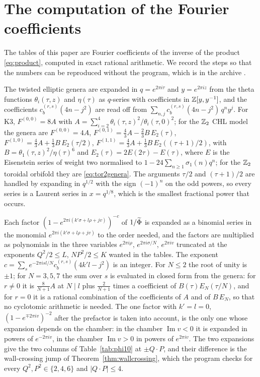 \section{The computation of the Fourier coefficients}\label{app:computation}

The tables of this paper are Fourier coefficients of the inverse of the product \eqref{eq:product}, computed in exact rational arithmetic. We record the steps so that the numbers can be reproduced without the program, which is in the archive \cite{Bha26}.

 The twisted elliptic genera are expanded in $q = e^{2\pi i\tau}$ and $y = e^{2\pi i z}$ from the theta functions $\theta_i(\tau,z)$ and $\eta(\tau)$ as $q$-series with coefficients in $\mathbb{Z}[y,y^{-1}]$, and the coefficients $c^{(r,s)}_b(4n-j^2)$ are read off from $\sum_{n,j} c^{(r,s)}_b(4n-j^2)\,q^n y^j$. For K3, $F^{(0,0)} = 8A$ with $A = \sum_{i=2}^4\theta_i(\tau,z)^2/\theta_i(\tau,0)^2$; for the $\mathbb{Z}_2$ CHL model the genera are $F^{(0,0)} = 4A$, $F^{(0,1)} = \tfrac43 A - \tfrac23 B\,E_2(\tau)$, $F^{(1,0)} = \tfrac43 A + \tfrac13 B\,E_2(\tau/2)$, $F^{(1,1)} = \tfrac43 A + \tfrac13 B\,E_2((\tau+1)/2)$, with $B = \theta_1(\tau,z)^2/\eta(\tau)^6$ and $E_2(\tau) = 2E(2\tau)-E(\tau)$, where $E$ is the Eisenstein series of weight two normalised to $1 - 24\sum_{n\ge1}\sigma_1(n)q^n$; for the $\mathbb{Z}_2$ toroidal orbifold they are \eqref{eq:tor2genera}. The arguments $\tau/2$ and $(\tau+1)/2$ are handled by expanding in $q^{1/2}$ with the sign $(-1)^n$ on the odd powers, so every series is a Laurent series in $x = q^{1/8}$, which is the smallest fractional power that occurs.

 Each factor $(1 - e^{2\pi i(k'\sigma + l\rho + jv)})^{-c}$ of $1/\widetilde{\Phi}$ is expanded as a binomial series in the monomial $e^{2\pi i(k'\sigma + l\rho + jv)}$ to the order needed, and the factors are multiplied as polynomials in the three variables $e^{2\pi i\rho}$, $e^{2\pi i\sigma/N}$, $e^{2\pi iv}$ truncated at the exponents $Q^2/2\le L$, $NP^2/2\le K$ wanted in the tables. The exponent $c = \sum_s e^{-2\pi i s l/N}c^{(r,s)}_b(4k'l-j^2)$ is an integer. For $N\le 2$ the root of unity is $\pm1$; for $N=3,5,7$ the sum over $s$ is evaluated in closed form from the genera: for $r\ne0$ it is $\frac{8}{N+1}A$ at $N\mid l$ plus $\frac{2}{N+1}$ times a coefficient of $B(\tau)E_N(\tau/N)$, and for $r=0$ it is a rational combination of the coefficients of $A$ and of $B\,E_N$, so that no cyclotomic arithmetic is needed. The one factor with $k'=l=0$, $(1 - e^{\mp 2\pi iv})^{-2}$ after the prefactor is taken into account, is the only one whose expansion depends on the chamber: in the chamber $\operatorname{Im} v<0$ it is expanded in powers of $e^{-2\pi iv}$, in the chamber $\operatorname{Im} v>0$ in powers of $e^{2\pi iv}$. The two expansions give the two columns of Table~\ref{tab:phi10} at $\pm Q\cdot P$, and their difference is the wall-crossing jump of Theorem~\ref{thm:wallcrossing}, which the program checks for every $Q^2,P^2\in\{2,4,6\}$ and $|Q\cdot P|\le 4$.

